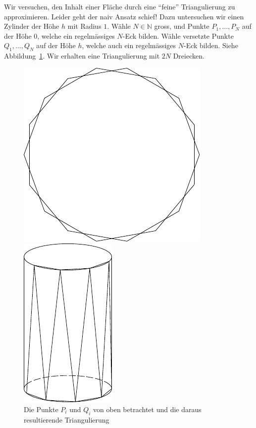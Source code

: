 \documentclass[../main.tex]{subfiles}
\begin{document}
\begin{example}
  Wir versuchen, den Inhalt einer Fläche durch eine
  ``feine'' Triangulierung zu approximieren.
  Leider geht der naiv Ansatz schief!
  Dazu untersuchen wir 
  einen Zylinder der Höhe $h$ mit Radius $1$.
  Wähle $N \in \mathbb{N}$ gross,
  und Punkte $P_1, \dots, P_N$ auf der Höhe $0$,
  welche ein regelmässiges $N$-Eck bilden.
  Wähle versetzte Punkte $Q_1, \dots, Q_N$ auf der Höhe $h$,
  welche auch ein regelmässiges $N$-Eck bilden.
  Siehe Abbildung~\ref{fig:n-gons}.
  Wir erhalten eine Triangulierung
  mit $2N$ Dreiecken.

\begin{figure}[htb] 
  \centering
  \begin{minipage}{0.50\textwidth}
    \centering
    \includegraphics{figures/n-gons}
  \end{minipage}%
  \begin{minipage}{0.50\textwidth}
    \centering
    \includegraphics{figures/triangulation}
  \end{minipage}%
   \caption{Die Punkte $P_i$ und $Q_i$ von oben betrachtet
   und die daraus resultierende Triangulierung}%
   \label{fig:n-gons}
\end{figure}


\end{example}
\end{document}
